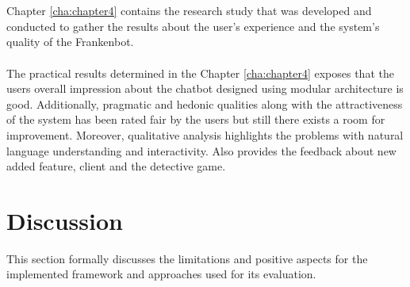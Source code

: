\\~\\
Chapter \ref{cha:chapter4} contains the research study that was developed and conducted to gather the results about the user's experience and the system's quality of the Frankenbot.
\\~\\
The practical results determined in the Chapter \ref{cha:chapter4} exposes that the users overall impression about the chatbot designed using modular architecture is good. Additionally, pragmatic and hedonic qualities along with the attractiveness of the system has been rated fair by the users but still there exists a room for improvement. Moreover, qualitative analysis highlights the problems with natural language understanding and interactivity. Also provides the feedback about new added feature, client and the detective game.

\section{Discussion\label{sec:discussion}}
This section formally discusses the limitations and positive aspects for the implemented framework and approaches used for its evaluation. 


